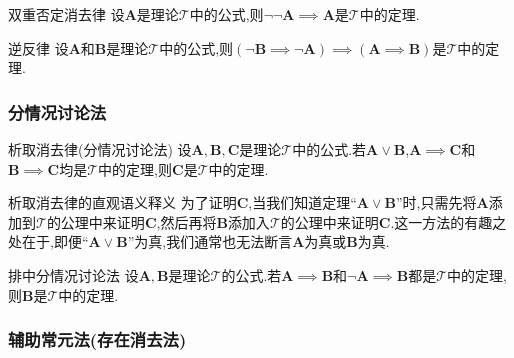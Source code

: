 \begin{metatheorem}{双重否定消去律}{}
	设$\boldsymbol{A}$是理论$\mathcal{T}$中的公式,则$\neg\neg\boldsymbol{A}\implies\boldsymbol{A}$是$\mathcal{T}$中的定理.
\end{metatheorem}

\begin{metatheorem}{逆反律}{}
	设$\boldsymbol{A}$和$\boldsymbol{B}$是理论$\mathcal{T}$中的公式,则$\left(\neg\boldsymbol{B}\implies\neg\boldsymbol{A}\right)\implies\left(\boldsymbol{A}\implies\boldsymbol{B}\right)$是$\mathcal{T}$中的定理.
\end{metatheorem}

\subsubsection*{分情况讨论法}

\begin{metatheorem}{析取消去律(分情况讨论法)}{}
	设$\boldsymbol{A},\boldsymbol{B},\boldsymbol{C}$是理论$\mathcal{T}$中的公式.若$\boldsymbol{A}\vee\boldsymbol{B}$,$\boldsymbol{A}\implies\boldsymbol{C}$和$\boldsymbol{B}\implies\boldsymbol{C}$均是$\mathcal{T}$中的定理,则$\boldsymbol{C}$是$\mathcal{T}$中的定理.
\end{metatheorem}

\begin{remark}{析取消去律的直观语义释义}{}
	为了证明$\boldsymbol{C}$,当我们知道定理``$\boldsymbol{A}\vee\boldsymbol{B}$''时,只需先将$\boldsymbol{A}$添加到$\mathcal{T}$的公理中来证明$\boldsymbol{C}$,然后再将$\boldsymbol{B}$添加入$\mathcal{T}$的公理中来证明$\boldsymbol{C}$.这一方法的有趣之处在于,即便``$\boldsymbol{A}\vee\boldsymbol{B}$''为真,我们通常也无法断言$\boldsymbol{A}$为真或$\boldsymbol{B}$为真.
\end{remark}

\begin{corollary}{排中分情况讨论法}{}
	设$\boldsymbol{A},\boldsymbol{B}$是理论$\mathcal{T}$的公式.若$\boldsymbol{A}\implies\boldsymbol{B}$和$\neg\boldsymbol{A}\implies\boldsymbol{B}$都是$\mathcal{T}$中的定理,则$\boldsymbol{B}$是$\mathcal{T}$中的定理.
\end{corollary}


\subsubsection*{辅助常元法(存在消去法)}

